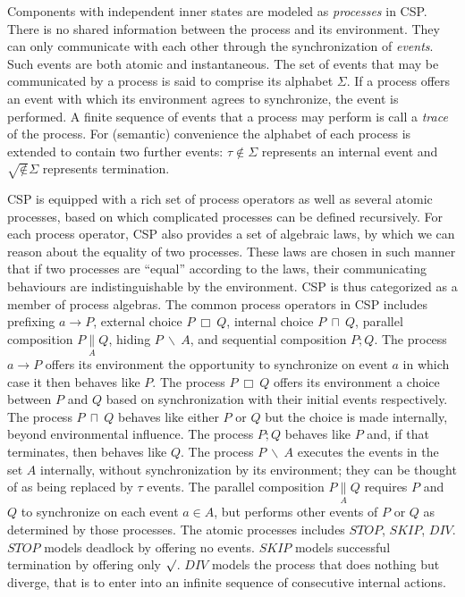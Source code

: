 \documentclass{llncs}
\newcommand{\csppre}[2]{#1 \rightarrow #2}
\newcommand{\cspint}[2]{#1\ \sqcap\ #2}
\newcommand{\cspext}[2]{#1\ \Box\ #2}
\newcommand{\cspseq}[2]{#1; #2}
\newcommand{\csppara}[3]{#1 \underset{#2}{\parallel} #3}
\newcommand{\csphide}[2]{#1\ \backslash\ #2}
\newcommand{\csptick}{\surd}
\newcommand{\csptau}{\tau}
\begin{document}
Components with independent inner states are modeled as \emph{processes} in
CSP. There is no shared information between the process and its environment. They
can only communicate with each other through the synchronization of
\emph{events}. Such events are both atomic and instantaneous. The set
of events that may be communicated by a process is said to comprise its
alphabet $\Sigma$. If a process offers an event with which its environment
agrees to synchronize, the event is performed. A finite sequence of events that
a process may perform is call a \emph{trace} of the process. For (semantic)
convenience the alphabet of each process is extended to contain two further
events: $\csptau \notin \Sigma$ represents an internal event and $\csptick \notin
\Sigma$ represents termination.


CSP is equipped with a rich set of process operators as well as several atomic
processes, based on which complicated processes can be defined recursively.
For each process operator, CSP also provides a set of algebraic
laws, by which we can reason about the equality of two processes.
These laws are chosen in such manner that if two processes are ``equal'' according
to the laws, their communicating behaviours are indistinguishable by the
environment. CSP is thus categorized as a member of process algebras. The
common process operators in CSP includes prefixing $\csppre{a}{P}$, external
choice $\cspext{P}{Q}$, internal choice $\cspint{P}{Q}$, parallel composition
$\csppara{P}{A}{Q}$, hiding $\csphide{P}{A}$, and sequential composition
$\cspseq{P}{Q}$. The process $\csppre{a}{P}$ offers its environment
the opportunity to synchronize on event $a$ in which case it
then behaves like $P$. The process $\cspext{P}{Q}$ offers its environment
a choice between $P$ and $Q$ based on synchronization with their initial
events respectively. The process $\cspint{P}{Q}$ behaves like either $P$ or
$Q$ but the choice is made internally, beyond environmental influence. The
process $\cspseq{P}{Q}$ behaves like $P$ and, if that terminates, then
behaves like $Q$. The process $\csphide{P}{A}$ executes the events in the
set $A$ internally, without synchronization by its environment; they can
be thought of as being replaced by $\csptau$ events. The parallel composition
$\csppara{P}{A}{Q}$ requires $P$ and $Q$ to synchronize on each event $a
\in A$, but performs other events of $P$ or $Q$ as determined by those
processes. The atomic processes includes $STOP$, $SKIP$, $DIV$. $STOP$ models
deadlock by offering no events. $SKIP$ models successful termination by
offering only $\csptick$. $DIV$ models the process that does nothing but
diverge, that is to enter into an infinite sequence of consecutive internal actions.
\end{document}
